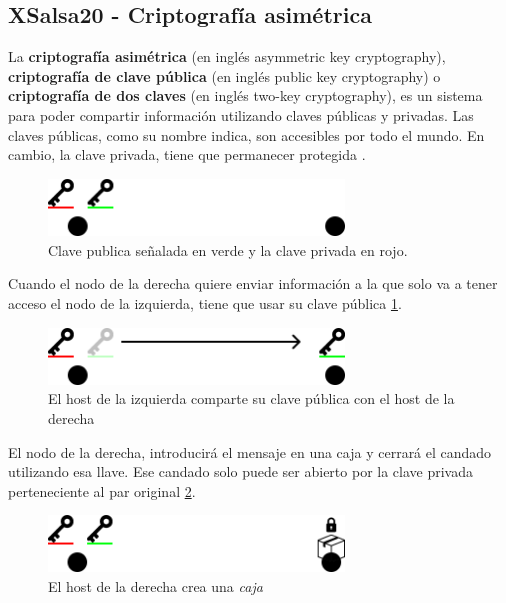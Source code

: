 \subsection{XSalsa20 - Criptografía asimétrica}
La \textbf{criptografía asimétrica} (en inglés asymmetric key cryptography), \textbf{criptografía de clave pública} (en inglés public key cryptography) o \textbf{criptografía de dos claves} (en inglés two-key cryptography), es un sistema para poder compartir información utilizando claves públicas y privadas. Las claves públicas, como su nombre indica, son accesibles por todo el mundo. En cambio, la clave privada, tiene que permanecer protegida \cite{web:asimetrica}.
\begin{figure}[h!]
    \centering
    \includegraphics[width=0.7\textwidth]{Figures/Claves.png}
    \caption{Clave publica señalada en verde y la clave privada en rojo.}
    \label{fg:clave}
\end{figure}
Cuando el nodo de la derecha quiere enviar información a la que solo va a tener acceso el nodo de la izquierda, tiene que usar su clave pública \ref{fg:clave}.
\begin{figure}[h!]
    \centering
    \includegraphics[width=0.7\textwidth]{Figures/Claves en movimiento(1).png}
    \caption{El host de la izquierda comparte su clave pública con el host de la derecha}
    \label{fg:movimiento}
\end{figure}
El nodo de la derecha, introducirá el mensaje en una caja y cerrará el candado utilizando esa llave. Ese candado solo puede ser abierto por la clave privada perteneciente al par original \ref{fg:movimiento}.
\begin{figure}[h!]
    \centering
    \includegraphics[width=0.7\textwidth]{Figures/Caja.png}
    \caption{El host de la derecha crea una \textit{caja}}
\end{figure}
